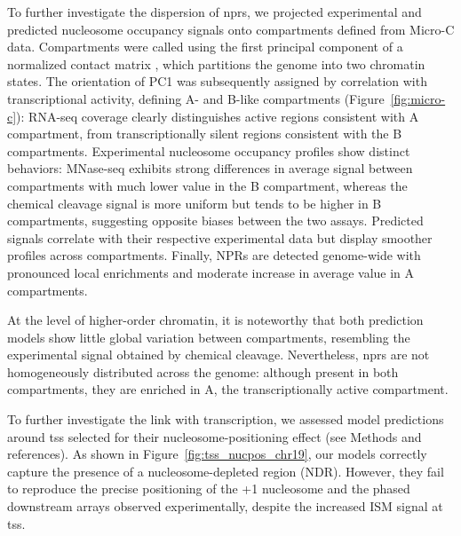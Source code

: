\documentclass[11pt]{book}
\begin{document}
To further investigate the dispersion of \glspl{npr}, we projected experimental and predicted nucleosome occupancy signals onto compartments defined from Micro-C data. Compartments were called using the first principal component of a normalized contact matrix \cite{cournac_normalization_2012}, which partitions the genome into two chromatin states. The orientation of PC1 was subsequently assigned by correlation with transcriptional activity, defining A- and B-like compartments (Figure~\ref{fig:micro-c}): RNA-seq coverage clearly distinguishes active regions consistent with A compartment, from transcriptionally silent regions consistent with the B compartments. 
Experimental nucleosome occupancy profiles show distinct behaviors: MNase-seq exhibits strong differences in average signal between compartments with much lower value in the B compartment, whereas the chemical cleavage signal is more uniform but tends to be higher in B compartments, suggesting opposite biases between the two assays. Predicted signals correlate with their respective experimental data but display smoother profiles across compartments. Finally, NPRs are detected genome-wide with pronounced local enrichments and moderate increase in average value in A compartments.

At the level of higher-order chromatin, it is noteworthy that both prediction models show little global variation between compartments, resembling the experimental signal obtained by chemical cleavage. Nevertheless, \glspl{npr} are not homogeneously distributed across the genome: although present in both compartments, they are enriched in A, the transcriptionally active compartment. 

To further investigate the link with transcription, we assessed model predictions around \gls{tss} selected for their nucleosome-positioning effect (see Methods and references). As shown in Figure~\ref{fig:tss_nucpos_chr19}, our models correctly capture the presence of a nucleosome-depleted region (NDR). However, they fail to reproduce the precise positioning of the +1 nucleosome and the phased downstream arrays observed experimentally, despite the increased ISM signal at \gls{tss}.
\end{document}
